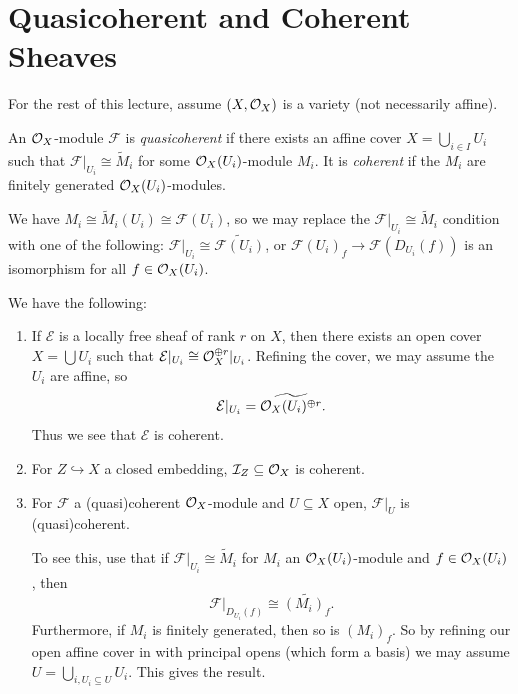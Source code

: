 \section{Quasicoherent and Coherent Sheaves}
\begin{remark}
  For the rest of this lecture,
  assume $(X, \mathcal{O}_X)$ is a variety
  (not necessarily affine).
\end{remark}

\begin{definition}
  An $\mathcal{O}_X$-module $\mathcal{F}$
  is \emph{quasicoherent}
  if there exists an affine cover
  $X = \bigcup_{i \in I} U_i$
  such that $\mathcal{F}|_{U_i} \cong \widetilde{M}_i$
  for some $\mathcal{O}_X(U_i)$-module $M_i$.
  It is \emph{coherent} if the
  $M_i$ are finitely generated
  $\mathcal{O}_X(U_i)$-modules.
\end{definition}

\begin{remark}
  We have $M_i \cong \widetilde{M}_i(U_i) \cong \mathcal{F}(U_i)$,
  so we may replace the
  $\mathcal{F}|_{U_i} \cong \widetilde{M}_i$
  condition with one of the
  following:
  $\mathcal{F}|_{U_i} \cong \widetilde{\mathcal{F}(U_i)}$,
  or $\mathcal{F}(U_i)_f \to \mathcal{F}(D_{U_i}(f))$
  is an isomorphism for
  all $f \in \mathcal{O}_X(U_i)$.
\end{remark}

\begin{example}
  We have the following:
  \begin{enumerate}
    \item If $\mathcal{E}$ is a
      locally free sheaf of rank $r$ 
      on $X$, then there exists an
      open cover $X = \bigcup U_i$
      such that $\mathcal{E}|_{U_i} \cong \mathcal{O}_X^{\oplus r}|_{U_i}$.
      Refining the cover, we may
      assume the $U_i$ are affine,
      so
      \[
        \mathcal{E}|_{U_i}
        = \widetilde{\mathcal{O}_X(U_i)^{\oplus r}}.
      \]
      Thus we see that
      $\mathcal{E}$ is coherent.
    \item For $Z \hookrightarrow X$
      a closed embedding,
      $\mathcal{I}_Z \subseteq \mathcal{O}_X$
      is coherent.
    \item For $\mathcal{F}$ a
      (quasi)coherent $\mathcal{O}_X$-module
      and $U \subseteq X$ open,
      $\mathcal{F}|_U$ is
      (quasi)coherent.

      To see this, use that if
      $\mathcal{F}|_{U_i} \cong \widetilde{M}_i$
      for $M_i$ an $\mathcal{O}_X(U_i)$-module
      and $f \in \mathcal{O}_X(U_i)$, then
      \[\mathcal{F}|_{D_{U_i}(f)} \cong \widetilde{(M_{i})_f}.\]
      Furthermore, if $M_i$
      is finitely generated, then so
      is $(M_i)_f$. So by
      refining our open affine cover in
      with principal
      opens (which form a basis)
      we may assume $U = \bigcup_{i, U_i \subseteq U} U_i$.
      This gives the result.
  \end{enumerate}
\end{example}

